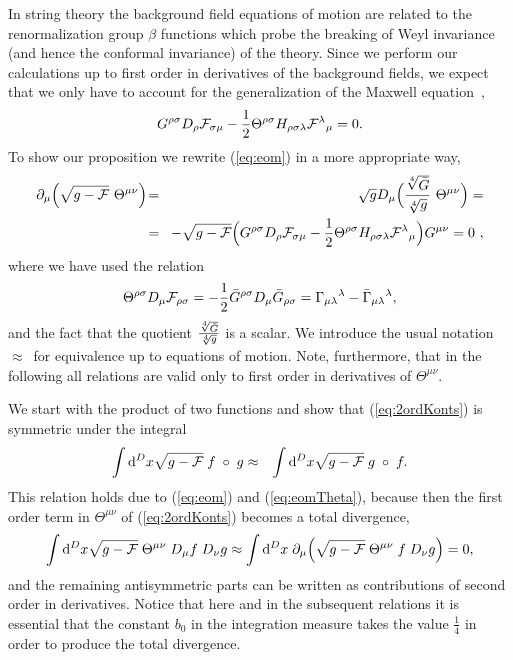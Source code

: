 \documentclass[a4paper,12pt]{article}
\newcommand {\ud} {\mathrm{d}}
\newcommand {\cF} {{\cal F}}
\begin{document}
In string theory the background field equations of motion are related
to the renormalization group $\beta$ functions which probe the breaking
of Weyl invariance (and hence the conformal invariance) of the theory.
Since we perform our calculations up to first order in derivatives
of the background fields, we expect that we only have to account for the
generalization of the Maxwell equation~\cite{Dorn:1986jf,Callan:1987bc},
\begin{eqnarray}
  \label{eq:eom}
  G^{\rho\sigma}D_\rho \cF_{\sigma\mu}
  -\frac 12 \Theta^{\rho\sigma}H_{\rho\sigma\lambda} \cF^\lambda{}_\mu = 0 .
\end{eqnarray}
To show our proposition we rewrite
(\ref{eq:eom}) in a more appropriate way,
\begin{eqnarray}
  \label{eq:eomTheta}
  \partial_\mu \Bigl(\sqrt{g-\cF}~\Theta^{\mu\nu} \Bigr) \!&=&\!
  \sqrt {g} D_\mu \Bigl(
  \frac {\root 4 \of {\bar G}}{\root 4 \of g}~\Theta^{\mu\nu} \Bigr)  =
\\
  \!&=&\! - \sqrt{g-\cF}
  \Bigl(G^{\rho\sigma}D_\rho \cF_{\sigma\mu}
  -\frac 12 \Theta^{\rho\sigma}H_{\rho\sigma\lambda} \cF^\lambda{}_\mu\Bigr)
  G^{\mu\nu} = 0~, \nonumber
\end{eqnarray}
where we have used the relation
\begin{eqnarray}
  \label{eq:relGamma}
  \Theta^{\rho\sigma} D_\mu \cF_{\rho\sigma} = 
  - \frac 12 \bar G^{\rho\sigma} D_\mu \bar G_{\rho\sigma} =
  \Gamma_{\mu\lambda}{}^\lambda - \bar \Gamma_{\mu\lambda}{}^\lambda ,
\end{eqnarray}
and the fact that the quotient
$\frac {\root 4 \of {\bar G}}{\root 4 \of g}$ is a scalar. We introduce
the usual notation~$\approx$~for equivalence up to equations of motion. 
Note, furthermore, that in the following all relations are valid only
to first order in derivatives of $\Theta^{\mu\nu}$.

We start with the product of two functions and show that (\ref{eq:2ordKonts})
is symmetric under the integral
\begin{eqnarray}
  \label{eq:trace2}
  \int\ud^{D} x \sqrt {g-\cF} \; f \; \circ \; g &\approx& 
  \int\ud^{D} x \sqrt {g-\cF} \; g \; \circ \; f .
\end{eqnarray}
This relation holds due to (\ref{eq:eom}) and (\ref{eq:eomTheta}), 
because then the first order term in $\Theta^{\mu\nu}$
of (\ref{eq:2ordKonts}) becomes a total divergence,
\begin{eqnarray}
  \label{eq:totaldiv}
  \int \ud^{D} x \sqrt {g-\cF} \; \Theta^{\mu\nu} \; D_\mu f \; D_\nu g
  \approx \int \ud^{D} x \; \partial_\mu \Bigl(
    \sqrt {g-\cF} \; \Theta^{\mu\nu} \; f \; D_\nu g \Bigr) = 0,
\end{eqnarray}
and the remaining antisymmetric parts can be written as contributions
of second order in derivatives. Notice that here and in the subsequent 
relations it is essential that the constant $b_0$ in the integration 
measure takes the value $\frac 14$ in order to produce the total divergence.
\end{document}
